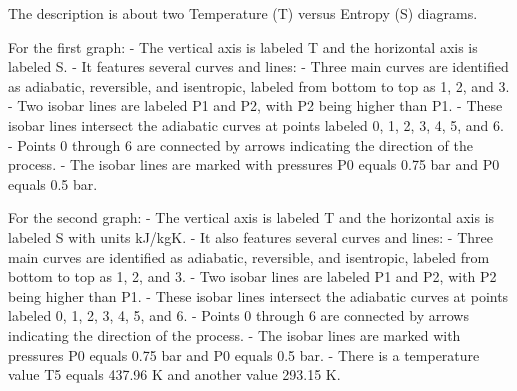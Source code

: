The description is about two Temperature (T) versus Entropy (S) diagrams. 

For the first graph:
- The vertical axis is labeled T and the horizontal axis is labeled S.
- It features several curves and lines:
  - Three main curves are identified as adiabatic, reversible, and isentropic, labeled from bottom to top as 1, 2, and 3.
  - Two isobar lines are labeled P1 and P2, with P2 being higher than P1.
  - These isobar lines intersect the adiabatic curves at points labeled 0, 1, 2, 3, 4, 5, and 6.
  - Points 0 through 6 are connected by arrows indicating the direction of the process.
  - The isobar lines are marked with pressures P0 equals 0.75 bar and P0 equals 0.5 bar.

For the second graph:
- The vertical axis is labeled T and the horizontal axis is labeled S with units kJ/kgK.
- It also features several curves and lines:
  - Three main curves are identified as adiabatic, reversible, and isentropic, labeled from bottom to top as 1, 2, and 3.
  - Two isobar lines are labeled P1 and P2, with P2 being higher than P1.
  - These isobar lines intersect the adiabatic curves at points labeled 0, 1, 2, 3, 4, 5, and 6.
  - Points 0 through 6 are connected by arrows indicating the direction of the process.
  - The isobar lines are marked with pressures P0 equals 0.75 bar and P0 equals 0.5 bar.
  - There is a temperature value T5 equals 437.96 K and another value 293.15 K.